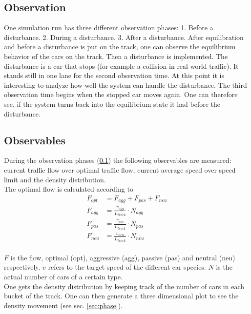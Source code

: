 \documentclass[11pt,a4paper,twocolumn]{article}
\begin{document}
\subsection{Observation} \label{subsec:observation}
One simulation run has three different observation phases: 1. Before a disturbance. 2. During a disturbance. 3. After a disturbance.
After equilibration and before a disturbance is put on the track, one can observe the equilibrium behavior of the cars on the track. Then a disturbance is implemented. The disturbance is a car that stops (for example a collision in real-world traffic). It stands still in one lane for the second observation time. At this point it is interesting to analyze how well the system can handle the disturbance. The third observation time begins when the stopped car moves again. One can therefore see, if the system turns back into the equilibrium state it had before the disturbance. \\

\subsection{Observables} \label{subsec:observables}

During the observation phases (\ref{subsec:observation}) the following observables are measured: current traffic flow over optimal traffic flow, current average speed over speed limit and the density distribution. \\
The optimal flow is calculated according to
\begin{align*}
F_{opt} &= F_{agg} + F_{pas} + F_{neu} \\
F_{agg} &= \frac{v_{agg}}{L_{track}} \cdot N_{agg} \\
F_{pas} &= \frac{v_{pas}}{L_{track}} \cdot N_{pas} \\
F_{neu} &= \frac{v_{neu}}{L_{track}} \cdot N_{neu} \\
\end{align*}

$F$ is the flow, optimal (opt), aggressive (agg), passive (pas) and neutral (neu) respectively. $v$ refers to the target speed of the different car species. $N$ is the actual number of cars of a certain type.\\
One gets the density distribution by keeping track of the number of cars in each bucket of the track. One can then generate a three dimensional plot to see the density movement (see sec. \ref{sec:phase}).


\end{document}
